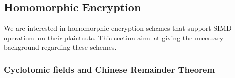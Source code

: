 


\subsection{Homomorphic Encryption}
We are interested in homomorphic encryption schemes that support SIMD operations on their plaintexts. 
This section aims at giving the necessary background regarding these schemes.

\subsubsection{Cyclotomic fields and Chinese Remainder Theorem}\label{subsec:crt}


